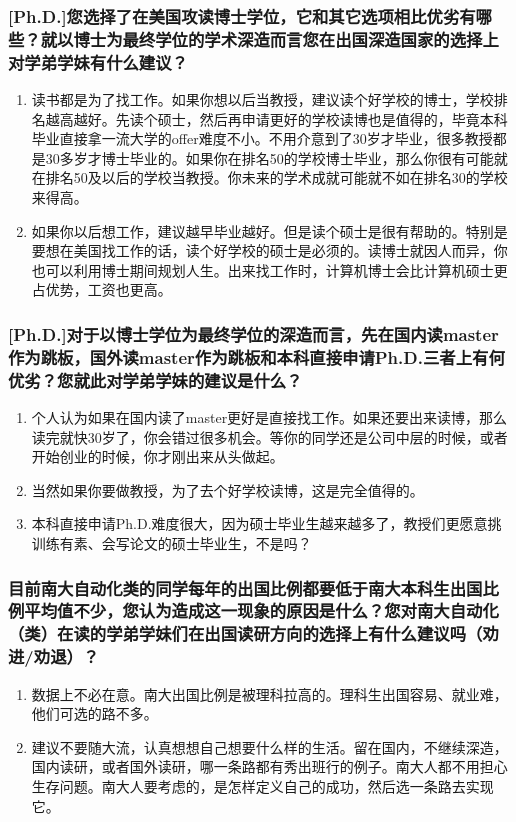 \documentclass[a4paper,UTF8]{book}
\begin{document}
    \subsubsection*{[Ph.D.]您选择了在美国攻读博士学位，它和其它选项相比优劣有哪些？就以博士为最终学位的学术深造而言您在出国深造国家的选择上对学弟学妹有什么建议？}
        \begin{enumerate}[itemindent=0pt,itemsep=0pt,parsep=0pt]
            \item 读书都是为了找工作。如果你想以后当教授，建议读个好学校的博士，学校排名越高越好。先读个硕士，然后再申请更好的学校读博也是值得的，毕竟本科毕业直接拿一流大学的offer难度不小。不用介意到了30岁才毕业，很多教授都是30多岁才博士毕业的。如果你在排名50的学校博士毕业，那么你很有可能就在排名50及以后的学校当教授。你未来的学术成就可能就不如在排名30的学校来得高。
            \item 如果你以后想工作，建议越早毕业越好。但是读个硕士是很有帮助的。特别是要想在美国找工作的话，读个好学校的硕士是必须的。读博士就因人而异，你也可以利用博士期间规划人生。出来找工作时，计算机博士会比计算机硕士更占优势，工资也更高。
        \end{enumerate}
    \subsubsection*{[Ph.D.]对于以博士学位为最终学位的深造而言，先在国内读master作为跳板，国外读master作为跳板和本科直接申请Ph.D.三者上有何优劣？您就此对学弟学妹的建议是什么？}
        \begin{enumerate}[itemindent=0pt,itemsep=0pt,parsep=0pt]
            \item 个人认为如果在国内读了master更好是直接找工作。如果还要出来读博，那么读完就快30岁了，你会错过很多机会。等你的同学还是公司中层的时候，或者开始创业的时候，你才刚出来从头做起。
            \item 当然如果你要做教授，为了去个好学校读博，这是完全值得的。
            \item 本科直接申请Ph.D.难度很大，因为硕士毕业生越来越多了，教授们更愿意挑训练有素、会写论文的硕士毕业生，不是吗？
        \end{enumerate}
    \subsubsection*{目前南大自动化类的同学每年的出国比例都要低于南大本科生出国比例平均值不少，您认为造成这一现象的原因是什么？您对南大自动化（类）在读的学弟学妹们在出国读研方向的选择上有什么建议吗（劝进/劝退）？}
        \begin{enumerate}[itemindent=0pt,itemsep=0pt,parsep=0pt]
            \item 数据上不必在意。南大出国比例是被理科拉高的。理科生出国容易、就业难，他们可选的路不多。
            \item 建议不要随大流，认真想想自己想要什么样的生活。留在国内，不继续深造，国内读研，或者国外读研，哪一条路都有秀出班行的例子。南大人都不用担心生存问题。南大人要考虑的，是怎样定义自己的成功，然后选一条路去实现它。
        \end{enumerate}
\end{document}
